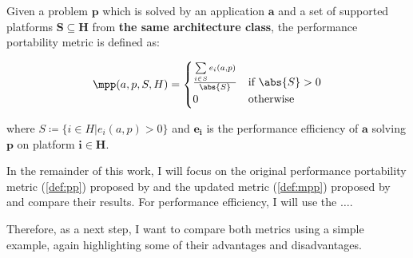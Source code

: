 \begin{definition}\label{def:mpp}
    Given a problem $\mathbf{p}$ which is solved by an application $\mathbf{a}$ and a set of supported platforms $\mathbf{S} \subseteq \mathbf{H}$ from \textbf{the same architecture class}, the performance portability metric \mpp is defined as:

    \[ \mpp(a, p, S, H) = 
        \begin{cases}
            \frac{\sum\limits_{i \in S} e_i(a, p)}{\abs{S}} & \text{if }\abs{S} > 0 \\
            0                                               & \text{otherwise}
        \end{cases} 
    \]

    where $S \coloneqq \{ i \in H | e_i(a, p) > 0 \}$ and $\mathbf{e_i}$ is the performance efficiency of $\mathbf{a}$ solving $\mathbf{p}$ on platform $\mathbf{i \in H}$.
\end{definition}

In the remainder of this work, I will focus on the original performance portability metric \pp (\autoref{def:pp}) proposed by \citet{pennycook_metric_2016} and the updated metric \mpp (\autoref{def:mpp}) proposed by \citet{marowka_comparison_2023} and compare their results. 
For performance efficiency, I will use the $\dots$.

Therefore, as a next step, I want to compare both metrics using a simple example, again highlighting some of their advantages and disadvantages. 
